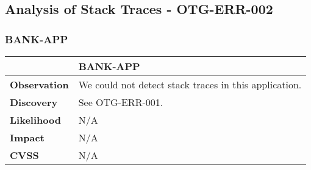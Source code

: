 \subsection{Analysis of Stack Traces - OTG-ERR-002}
\subsubsection{BANK-APP}
\begin{longtable*}{ p{.20\textwidth} | p{.75\textwidth} }\hline
    & \textbf{BANK-APP} \\ \hline
    \textbf{Observation} & 
    	We could not detect stack traces in this application.
    \\
    \textbf{Discovery} &
    	See OTG-ERR-001.
    \\
    \textbf{Likelihood} &
    	N/A
    \\
    \textbf{Impact} & 
    	N/A
    \\
    \textbf{CVSS} &
        N/A
    \\ \hline
\end{longtable*}
